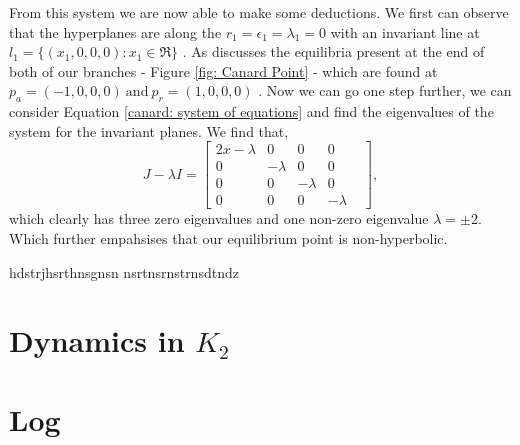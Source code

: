 \documentclass{article}
\begin{document}
From this system we are now able to make some deductions. We first can observe that the hyperplanes are along the $r_1=\epsilon_1=\lambda_1=0$ with an invariant line at $l_1=\{(x_1,0,0,0): x_1\in\Re\}$ \citep{krupa2001}. As \citet{krupa2001} discusses the equilibria present at the end of both of our branches - Figure \ref{fig: Canard Point} - which are found at $p_a=(-1,0,0,0) \ \text{and} \ p_r=(1,0,0,0)$ \citep{krupa2001}. Now we can go one step further, we can consider Equation \ref{canard: system of equations} and find the eigenvalues of the system for the invariant planes. We find that, 
\begin{equation}
    J-\lambda I= \begin{bmatrix}
    2x-\lambda & 0 & 0 & 0  \\
    0 & -\lambda & 0 & 0&\\
    0 & 0 & -\lambda & 0 \\
    0 & 0 & 0 & -\lambda
\end{bmatrix},
\end{equation}
which clearly has three zero eigenvalues and one non-zero eigenvalue $\lambda=\pm 2$. Which further empahsises that our equilibrium point is non-hyperbolic.  


hdstrjhsrthnsgnsn
nsrtnsrnstrnsdtndz







\newpage
\appendix
\section{Dynamics in \texorpdfstring{$K_2$}{K2}}

\newpage


\nocite{strogatz2007nonlinear}
\appendix
\section{Log}
\end{document}

